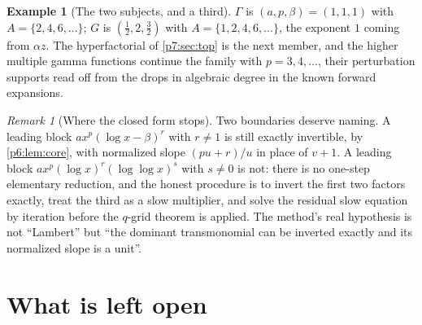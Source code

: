 \documentclass[11pt,a4paper,oneside]{book}
\theoremstyle{plain}
\theoremstyle{definition}
\newtheorem{example}[theorem]{Example}
\theoremstyle{remark}
\newtheorem{remark}[theorem]{Remark}
\begin{document}
\begin{example}[The two subjects, and a third]\label{p6:ex:instances}
$\Gamma$ is $(a,p,\beta)=(1,1,1)$ with $A=\{2,4,6,\dots\}$; $G$ is
$(\tfrac12,2,\tfrac32)$ with $A=\{1,2,4,6,\dots\}$, the exponent $1$ coming
from $\alpha z$.  The hyperfactorial of \cref{p7:sec:top} is the next member,
and the higher multiple gamma functions continue the family with $p=3,4,\dots$,
their perturbation supports read off from the drops in algebraic degree in the
known forward expansions.
\end{example}

\begin{remark}[Where the closed form stops]\label{p6:rem:limits-of-method}
Two boundaries deserve naming.  A leading block
$a x^{p}(\log x-\beta)^{r}$ with $r\ne1$ is still exactly invertible, by
\cref{p6:lem:core}, with normalized slope $(pu+r)/u$ in place of $v+1$.  A
leading block $ax^{p}(\log x)^{r}(\log\log x)^{s}$ with $s\ne0$ is not: there
is no one-step elementary reduction, and the honest procedure is to invert the
first two factors exactly, treat the third as a slow multiplier, and solve the
residual slow equation by iteration before the $q$-grid theorem is applied.
The method's real hypothesis is not ``Lambert'' but ``the dominant
transmonomial can be inverted exactly and its normalized slope is a unit''.
\end{remark}

\section{What is left open}
\label{p6:sec:open}
\end{document}
